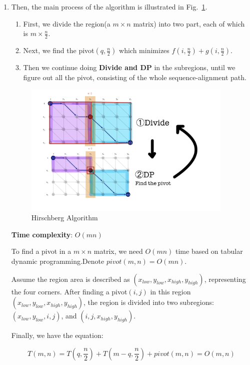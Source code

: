 \documentclass[12pt,a4paper]{article}
\makeatletter
\newtheorem*{solution}{Solution}
\theoremstyle{definition}
\renewenvironment{solution}[1][Solution] {\par\pushQED{\qed}\normalfont\topsep6\p@\@plus6\p@\relax\trivlist\item[\hskip\labelsep\bfseries#1\@addpunct{.}]\ignorespaces}{\popQED\endtrivlist\@endpefalse} \makeatother
\makeatother
\begin{document}
\begin{enumerate}
\begin{enumerate}
\begin{solution}
    	Then, the main process of the algorithm is illustrated in Fig.~\ref{q1}.
        \begin{enumerate}
            \item First, we divide the region(a $m\times n$ matrix) into two part, each of which is $m\times \frac{n}{2}$.
            \item Next, we find the pivot$(q,\frac{n}{2})$ which minimizes $f(i,\frac n2) + g(i,\frac n2)$.
            \item Then we continue doing \textbf{Divide and DP} in the subregions, until we figure out all the pivot, consisting of the whole sequence-alignment path.
        \end{enumerate}
    	\begin{figure}[htbp]
    	    \centering
    	    \includegraphics[width=10cm]{q1.jpg}
    	    \caption{Hirschberg Algorithm}
    	    \label{q1}
    	\end{figure}
    	
    	\textbf{Time complexity}: $O(mn)$
    	
    	To find a pivot in a $m\times n$ matrix, we need $O(mn)$ time based on tabular dynamic programming.Denote $pivot(m,n)=O(mn)$.
    	
        Assume the region area is described as $(x_{low}, y_{low}, x_{high}, y_{high})$, representing the four corners. After finding a pivot$(i,j)$ in this region$(x_{low}, y_{low}, x_{high}, y_{high})$, the region is divided into two subregions: $(x_{low}, y_{low}, i, j)$, and $(i, j, x_{high}, y_{high})$. 
        
        Finally, we have the equation:

    	$$
    	T(m,n) = T(q,\frac n2) + T(m-q,\frac n2) + pivot(m,n) = O(m,n)
    	$$
    	

\end{solution}
\end{enumerate}
\end{enumerate}
\end{document}
